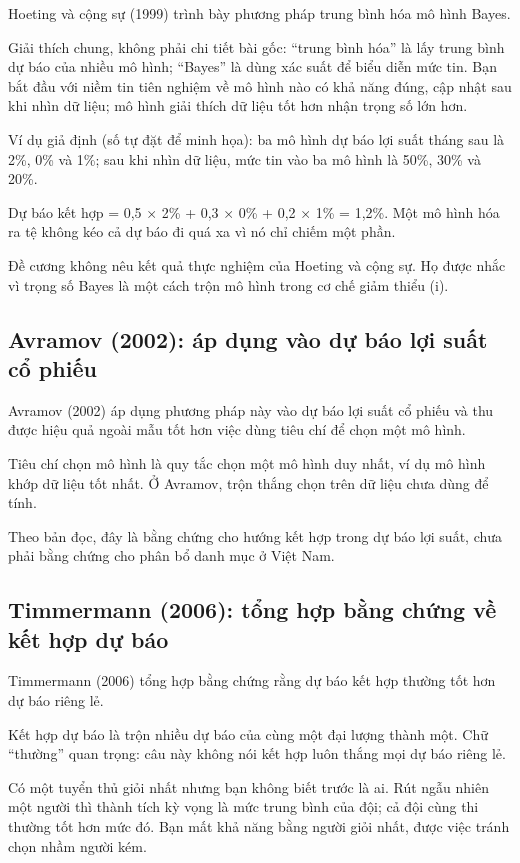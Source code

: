 Hoeting và cộng sự (1999) trình bày phương pháp trung bình hóa mô hình Bayes.

Giải thích chung, không phải chi tiết bài gốc: “trung bình hóa” là lấy trung bình dự báo của nhiều mô hình; “Bayes” là dùng xác suất để biểu diễn mức tin. Bạn bắt đầu với niềm tin tiên nghiệm về mô hình nào có khả năng đúng, cập nhật sau khi nhìn dữ liệu; mô hình giải thích dữ liệu tốt hơn nhận trọng số lớn hơn.

\begin{tcolorbox}[breakable]
Ví dụ giả định (số tự đặt để minh họa): ba mô hình dự báo lợi suất tháng sau là 2\%, 0\% và 1\%; sau khi nhìn dữ liệu, mức tin vào ba mô hình là 50\%, 30\% và 20\%.

Dự báo kết hợp = 0,5 × 2\% + 0,3 × 0\% + 0,2 × 1\% = 1,2\%. Một mô hình hóa ra tệ không kéo cả dự báo đi quá xa vì nó chỉ chiếm một phần.
\end{tcolorbox}

Đề cương không nêu kết quả thực nghiệm của Hoeting và cộng sự. Họ được nhắc vì trọng số Bayes là một cách trộn mô hình trong cơ chế giảm thiểu (i).

\subsection{Avramov (2002): áp dụng vào dự báo lợi suất cổ phiếu}

Avramov (2002) áp dụng phương pháp này vào dự báo lợi suất cổ phiếu và thu được hiệu quả ngoài mẫu tốt hơn việc dùng tiêu chí để chọn một mô hình.

Tiêu chí chọn mô hình là quy tắc chọn một mô hình duy nhất, ví dụ mô hình khớp dữ liệu tốt nhất. Ở Avramov, trộn thắng chọn trên dữ liệu chưa dùng để tính.

Theo bản đọc, đây là bằng chứng cho hướng kết hợp trong dự báo lợi suất, chưa phải bằng chứng cho phân bổ danh mục ở Việt Nam.

\subsection{Timmermann (2006): tổng hợp bằng chứng về kết hợp dự báo}

Timmermann (2006) tổng hợp bằng chứng rằng dự báo kết hợp thường tốt hơn dự báo riêng lẻ.

Kết hợp dự báo là trộn nhiều dự báo của cùng một đại lượng thành một. Chữ “thường” quan trọng: câu này không nói kết hợp luôn thắng mọi dự báo riêng lẻ.

Có một tuyển thủ giỏi nhất nhưng bạn không biết trước là ai. Rút ngẫu nhiên một người thì thành tích kỳ vọng là mức trung bình của đội; cả đội cùng thi thường tốt hơn mức đó. Bạn mất khả năng bằng người giỏi nhất, được việc tránh chọn nhầm người kém.

